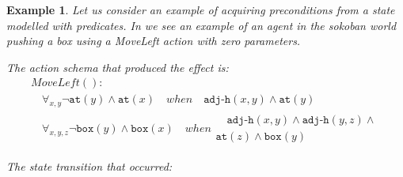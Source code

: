 \documentclass[../Master.tex]{subfiles}
\begin{document}
\newtheorem{thm-sokoban-example-initial-precond}{Example}[section]
\begin{thm-sokoban-example-initial-precond}\label{thm:sokoban-example-initial-precond}
Let us consider an example of acquiring preconditions from a state modelled with predicates. In  we see an example of an agent in the sokoban world pushing a box using a MoveLeft action with zero parameters.

The action schema that produced the effect is:
\begin{align*}
&MoveLeft():&  \\
&\quad \forall_{x, y}  \neg\texttt{at}(y) \land \texttt{at}(x) \quad when \quad \texttt{adj-h}(x,y) \land \texttt{at}(y)& \\
&\quad \forall_{x, y, z} \neg\texttt{box}(y) \land \texttt{box}(x) \quad when 
			\begin{gathered} 
				\quad \texttt{adj-h}(x,y) \land \texttt{adj-h}(y,z) \land \\ 
					  \texttt{at}(z) \land \texttt{box}(y) 
			\end{gathered}&
\end{align*}

The state transition that occurred:


\end{thm-sokoban-example-initial-precond}
\end{document}
